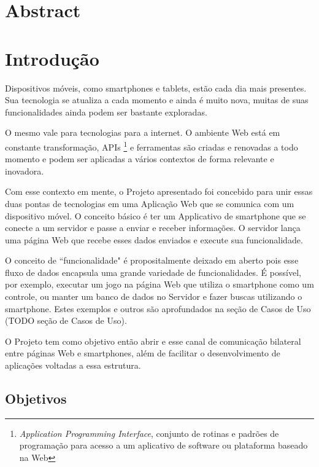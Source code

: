 \documentclass[a4paper,12pt]{article}
\begin{document}
\newpage
\section{Abstract}


\newpage
\section{Introdução}

Dispositivos móveis, como smartphones e tablets, estão cada dia mais presentes. Sua tecnologia se atualiza a cada momento e ainda é muito nova, muitas de suas funcionalidades ainda podem ser bastante exploradas.

O mesmo vale para tecnologias para a internet. O ambiente Web está em constante transformação, APIs \footnote{\emph{Application Programming Interface}, conjunto de rotinas e padrões de programação para acesso a um aplicativo de software ou plataforma baseado na Web} e ferramentas são criadas e renovadas a todo momento e podem ser aplicadas a vários contextos de forma relevante e inovadora.

Com esse contexto em mente, o Projeto apresentado foi concebido para unir essas duas pontas de tecnologias em uma Aplicação Web que se comunica com um dispositivo móvel. O conceito básico é ter um Applicativo de smartphone que se conecte a um servidor e passe a enviar e receber informações. O servidor lança uma página Web que recebe esses dados enviados e execute sua funcionalidade.

O conceito de “funcionalidade" é propositalmente deixado em aberto pois esse fluxo de dados encapsula uma grande variedade de funcionalidades. É possível, por exemplo, executar um jogo na página Web que utiliza o smartphone como um controle, ou manter um banco de dados no Servidor e fazer buscas utilizando o smartphone. Estes exemplos e outros são aprofundados na seção de Casos de Uso (TODO seção de Casos de Uso).

O Projeto tem como objetivo então abrir e esse canal de comunicação bilateral entre páginas Web e smartphones, além de facilitar o desenvolvimento de aplicações voltadas a essa estrutura.




\newpage
\subsection{Objetivos}
\end{document}

